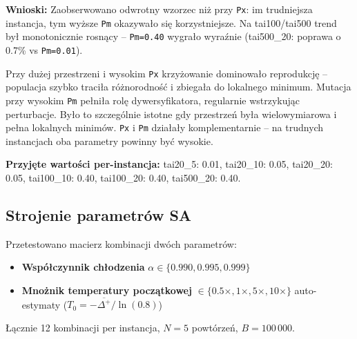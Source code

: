 \documentclass[11pt,a4paper]{article}
\begin{document}
\textbf{Wnioski:} Zaobserwowano odwrotny wzorzec niż przy \texttt{Px}: im trudniejsza instancja, tym wyższe \texttt{Pm} okazywało się korzystniejsze. Na tai100/tai500 trend był monotonicznie rosnący -- \texttt{Pm=0.40} wygrało wyraźnie (tai500\_20: poprawa o 0.7\% vs \texttt{Pm=0.01}).

Przy dużej przestrzeni i wysokim \texttt{Px} krzyżowanie dominowało reprodukcję -- populacja szybko traciła różnorodność i zbiegała do lokalnego minimum. Mutacja przy wysokim \texttt{Pm} pełniła rolę dywersyfikatora, regularnie wstrzykując perturbacje. Było to szczególnie istotne gdy przestrzeń była wielowymiarowa i pełna lokalnych minimów. \texttt{Px} i \texttt{Pm} działały komplementarnie -- na trudnych instancjach oba parametry powinny być wysokie.

\textbf{Przyjęte wartości per-instancja:} tai20\_5: 0.01, tai20\_10: 0.05, tai20\_20: 0.05, tai100\_10: 0.40, tai100\_20: 0.40, tai500\_20: 0.40.

\subsection{Strojenie parametrów SA}

Przetestowano macierz kombinacji dwóch parametrów:
\begin{itemize}
    \item \textbf{Współczynnik chłodzenia} $\alpha \in \{0.990, 0.995, 0.999\}$
    \item \textbf{Mnożnik temperatury początkowej} $\in \{0.5\times, 1\times, 5\times, 10\times\}$ auto-estymaty ($T_0 = -\overline{\Delta^+}/\ln(0.8)$)
\end{itemize}

Łącznie 12 kombinacji per instancja, $N=5$ powtórzeń, $B=100\,000$.
\end{document}
